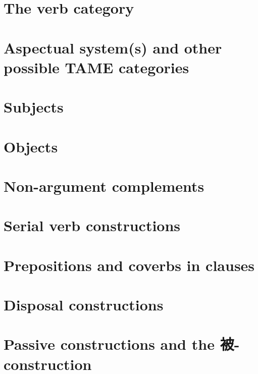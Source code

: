 \documentclass[UTF8, a4paper, oneside, scheme=plain]{ctexbook}
\numberwithin{equation}{chapter}
\begin{document}


\chapter{The verb category}



\chapter{Aspectual system(s) and other possible TAME categories}\label{chap:aspect}



\chapter{Subjects}



\chapter{Objects}



\chapter{Non-argument complements}\label{chap:non-argument-complement}



\chapter{Serial verb constructions} %

\chapter{Prepositions and coverbs in clauses}\label{chap:coverbs}



\chapter{Disposal constructions}\label{chap:disposal}

\chapter{Passive constructions and the 被-construction}\label{chap:passive}
\end{document}
